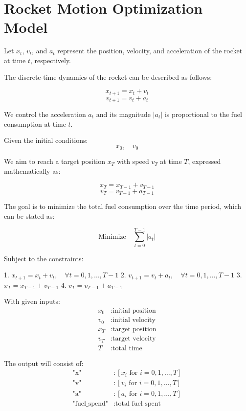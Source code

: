 \documentclass{article}
\begin{document}
\section*{Rocket Motion Optimization Model}

Let \( x_t \), \( v_t \), and \( a_t \) represent the position, velocity, and acceleration of the rocket at time \( t \), respectively.

The discrete-time dynamics of the rocket can be described as follows:

\[
x_{t+1} = x_t + v_t
\]
\[
v_{t+1} = v_t + a_t
\]

We control the acceleration \( a_t \) and its magnitude \( |a_t| \) is proportional to the fuel consumption at time \( t \).

Given the initial conditions:
\[
x_0, \quad v_0
\]

We aim to reach a target position \( x_T \) with speed \( v_T \) at time \( T \), expressed mathematically as:

\[
x_T = x_{T-1} + v_{T-1}
\]
\[
v_T = v_{T-1} + a_{T-1}
\]

The goal is to minimize the total fuel consumption over the time period, which can be stated as:

\[
\text{Minimize} \quad \sum_{t=0}^{T-1} |a_t|
\]

Subject to the constraints:

1. \( x_{t+1} = x_t + v_t, \quad \forall t = 0, 1, \ldots, T-1 \)
2. \( v_{t+1} = v_t + a_t, \quad \forall t = 0, 1, \ldots, T-1 \)
3. \( x_T = x_{T-1} + v_{T-1} \)
4. \( v_T = v_{T-1} + a_{T-1} \)

With given inputs:
\[
\begin{align*}
x_0 & : \text{initial position} \\
v_0 & : \text{initial velocity} \\
x_T & : \text{target position} \\
v_T & : \text{target velocity} \\
T & : \text{total time}
\end{align*}
\]

The output will consist of:
\[
\begin{align*}
\text{"x"} & : [x_i \text{ for } i = 0, 1, \ldots, T] \\
\text{"v"} & : [v_i \text{ for } i = 0, 1, \ldots, T] \\
\text{"a"} & : [a_i \text{ for } i = 0, 1, \ldots, T] \\
\text{"fuel\_spend"} & : \text{total fuel spent}
\end{align*}
\]
\end{document}
